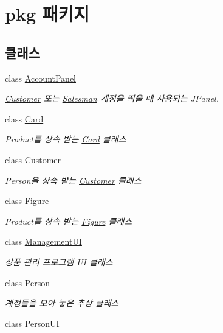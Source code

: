 \hypertarget{namespacepkg}{}\section{pkg 패키지}
\label{namespacepkg}
\subsection*{클래스}
\begin{DoxyCompactItemize}
\item 
class \hyperlink{classpkg_1_1_account_panel}{Account\+Panel}
\begin{DoxyCompactList}\small\item\em \hyperlink{classpkg_1_1_customer}{Customer} 또는 \hyperlink{classpkg_1_1_salesman}{Salesman} 계정을 띄울 때 사용되는 J\+Panel. \end{DoxyCompactList}\item 
class \hyperlink{classpkg_1_1_card}{Card}
\begin{DoxyCompactList}\small\item\em Product를 상속 받는 \hyperlink{classpkg_1_1_card}{Card} 클래스 \end{DoxyCompactList}\item 
class \hyperlink{classpkg_1_1_customer}{Customer}
\begin{DoxyCompactList}\small\item\em Person을 상속 받는 \hyperlink{classpkg_1_1_customer}{Customer} 클래스 \end{DoxyCompactList}\item 
class \hyperlink{classpkg_1_1_figure}{Figure}
\begin{DoxyCompactList}\small\item\em Product를 상속 받는 \hyperlink{classpkg_1_1_figure}{Figure} 클래스 \end{DoxyCompactList}\item 
class \hyperlink{classpkg_1_1_management_u_i}{Management\+UI}
\begin{DoxyCompactList}\small\item\em 상품 관리 프로그램 UI 클래스 \end{DoxyCompactList}\item 
class \hyperlink{classpkg_1_1_person}{Person}
\begin{DoxyCompactList}\small\item\em 계정들을 모아 놓은 추상 클래스 \end{DoxyCompactList}\item 
class \hyperlink{classpkg_1_1_person_u_i}{Person\+UI}

\end{DoxyCompactItemize}

